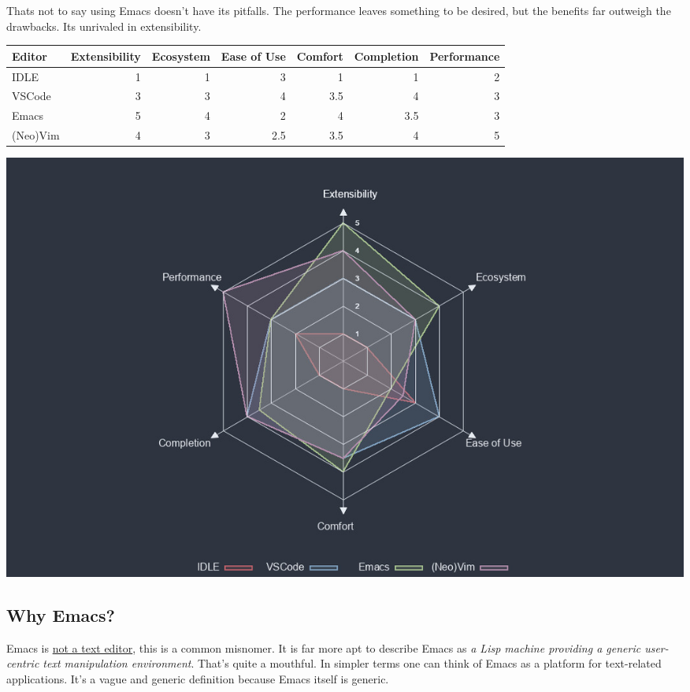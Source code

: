 \documentclass{scrartcl}
\begin{document}
Thats not to say using Emacs doesn't have its pitfalls. The performance leaves
something to be desired, but the benefits far outweigh the drawbacks. Its
unrivaled in extensibility.

\begin{center}
\begin{tabular}{lrrrrrr}
\toprule
Editor & Extensibility & Ecosystem & Ease of Use & Comfort & Completion & Performance\\
\midrule
IDLE & 1 & 1 & 3 & 1 & 1 & 2\\
VSCode & 3 & 3 & 4 & 3.5 & 4 & 3\\
Emacs & 5 & 4 & 2 & 4 & 3.5 & 3\\
(Neo)Vim & 4 & 3 & 2.5 & 3.5 & 4 & 5\\
\bottomrule
\end{tabular}
\end{center}

\begin{center}
\includegraphics[width=.9\linewidth]{./misc/editor-comparison.jpeg}
\end{center}
\subsection{Why Emacs?}
\label{sec:orgce2d0e2}
Emacs is \href{https://www.eigenbahn.com/2020/01/12/emacs-is-no-editor}{not a text editor}, this is a common misnomer. It is far more apt to
describe Emacs as \emph{a Lisp machine providing a generic user-centric text
manipulation environment}. That's quite a mouthful.
In simpler terms one can think of Emacs as a platform for text-related
applications. It's a vague and generic definition because Emacs itself is
generic.
\end{document}
